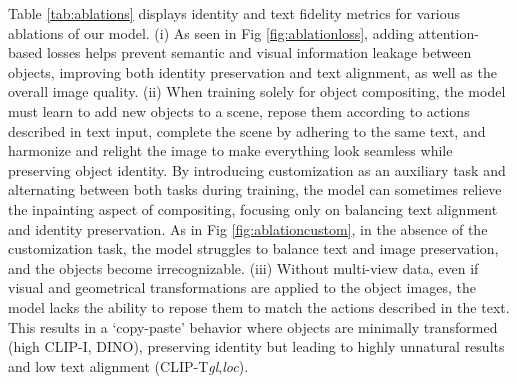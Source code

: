 Table \ref{tab:ablations} displays identity and text fidelity metrics for various ablations of our model. (i) As seen in Fig \ref{fig:ablationloss}, adding attention-based losses helps prevent semantic and visual information leakage between objects, improving both identity preservation and text alignment, as well as the overall image quality. (ii) When training solely for object compositing, the model must learn to add new objects to a scene, repose them according to actions described in text input, complete the scene by adhering to the same text, and harmonize and relight the image to make everything look seamless while preserving object identity. By introducing customization as an auxiliary task and alternating between both tasks during training, the model can sometimes relieve the inpainting aspect of compositing, focusing only on balancing text alignment and identity preservation. As in Fig \ref{fig:ablationcustom}, in the absence of the customization task, the model struggles to balance text and image preservation, and the objects become irrecognizable. (iii) Without multi-view data, even if visual and geometrical transformations are applied to the object images, the model lacks the ability to repose them to match the actions described in the text. This results in a `copy-paste' behavior where objects are minimally transformed (high CLIP-I, DINO), preserving identity but leading to highly unnatural results and low text alignment (CLIP-T\textit{gl},\textit{loc}).





